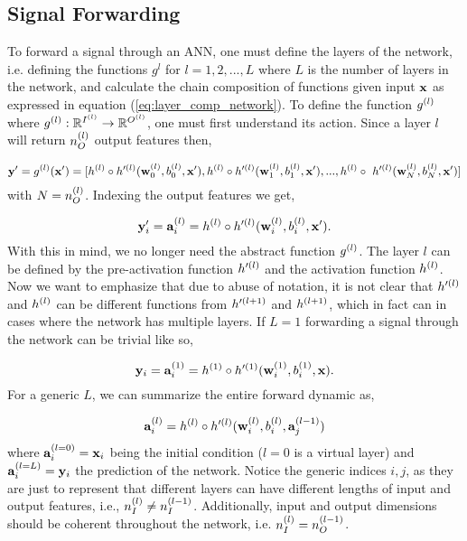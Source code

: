 \subsection{Signal Forwarding}
To forward a signal through an \gls{ANN}, one must define the layers of the network, i.e. defining the functions $ g^{l} $ for $ l = 1, 2, ..., L $ where $ L $ is the number of layers in the network, and calculate the chain composition of functions given input $ \mathbf{x} $ as expressed in equation (\ref{eq:layer_comp_network}). To define the function $ g^{(l)} $ where $ g^{(l)}: \mathbb{R}^{I^{(l)}} \rightarrow \mathbb{R}^{O^{(l)}} $, one must first understand its action. Since a layer $ l $ will return $ n^{(l)}_{O} $ output features then,

\begin{equation}
	\mathbf{y}' = g^{(l)}(\mathbf{x}') = [h^{(l)} \circ h'^{(l)}(\mathbf{w}^{(l)}_{0}, b^{(l)}_{0}, \mathbf{x}'), h^{(l)} \circ h'^{(l)}(\mathbf{w}^{(l)}_{1}, b^{(l)}_{1}, \mathbf{x}'), ..., h^{(l)} \circ \ h'^{(l)} (\mathbf{w}^{(l)}_{N}, b^{(l)}_{N}, \mathbf{x}')]
\end{equation}
with $ N = n^{(l)}_{O} $. Indexing the output features we get,

\begin{equation}
	\mathbf{y}'_i = \mathbf{a}^{(l)}_{i} = h^{(l)} \circ h'^{(l)}(\mathbf{w}^{(l)}_{i}, b^{(l)}_{i}, \mathbf{x}').
\end{equation}
With this in mind, we no longer need the abstract function $ g^{(l)} $. The layer $ l $ can be defined by the pre-activation function $ h'^{(l)} $ and the activation function $ h^{(l)} $. Now we want to emphasize that due to abuse of notation, it is not clear that $ h'^{(l)} $ and $ h^{(l)} $ can be different functions from $ h'^{(l+1)} $ and $ h^{(l+1)} $, which in fact can in cases where the network has multiple layers. If $ L = 1 $ forwarding a signal through the network can be trivial like so,

\begin{equation}
	\mathbf{y}_i =  \mathbf{a}^{(1)}_{i} = h^{(1)} \circ h'^{(1)} (\mathbf{w}^{(1)}_{i}, b^{(1)}_{i}, \mathbf{x}).
\end{equation}
For a generic $ L $, we can summarize the entire forward dynamic as,

\begin{equation}
	\mathbf{a}^{(l)}_{i} = h^{(l)} \circ h'^{(l)} (\mathbf{w}^{(l)}_{i}, b^{(l)}_{i}, \mathbf{a}^{(l-1)}_{j})
\end{equation}
where $ \mathbf{a}^{(l=0)}_{i} = \mathbf{x}_i $ being the initial condition ($ l = 0 $ is a virtual layer) and $ \mathbf{a}^{(l=L)}_{i} = \mathbf{y}_i $ the prediction of the network. Notice the generic indices $ i, j $, as they are just to represent that different layers can have different lengths of input and output features, i.e., $ n^{(l)}_{I} \neq n^{(l-1)}_{I} $. Additionally, input and output dimensions should be coherent throughout the network, i.e. $ n^{(l)}_{I} = n^{(l-1)}_{O} $.

